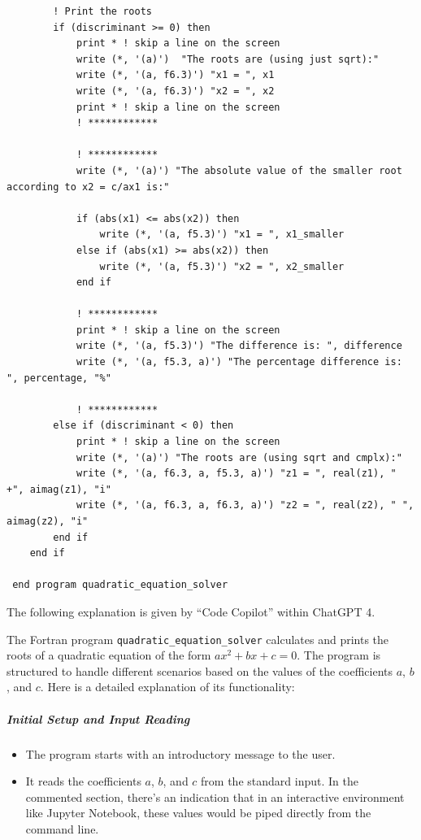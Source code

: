 \begin{verbatim}
        ! Print the roots
        if (discriminant >= 0) then
            print * ! skip a line on the screen
            write (*, '(a)')  "The roots are (using just sqrt):"
            write (*, '(a, f6.3)') "x1 = ", x1
            write (*, '(a, f6.3)') "x2 = ", x2
            print * ! skip a line on the screen
            ! ************

            ! ************
            write (*, '(a)') "The absolute value of the smaller root according to x2 = c/ax1 is:"

            if (abs(x1) <= abs(x2)) then
                write (*, '(a, f5.3)') "x1 = ", x1_smaller
            else if (abs(x1) >= abs(x2)) then
                write (*, '(a, f5.3)') "x2 = ", x2_smaller
            end if

            ! ************
            print * ! skip a line on the screen
            write (*, '(a, f5.3)') "The difference is: ", difference
            write (*, '(a, f5.3, a)') "The percentage difference is: ", percentage, "%"

            ! ************
        else if (discriminant < 0) then
            print * ! skip a line on the screen
            write (*, '(a)') "The roots are (using sqrt and cmplx):"
            write (*, '(a, f6.3, a, f5.3, a)') "z1 = ", real(z1), " +", aimag(z1), "i"
            write (*, '(a, f6.3, a, f6.3, a)') "z2 = ", real(z2), " ",  aimag(z2), "i"
        end if
    end if

 end program quadratic_equation_solver
\end{verbatim}

The following explanation is given by ``Code Copilot'' within ChatGPT 4.

The Fortran program \texttt{quadratic\_equation\_solver} calculates and prints the roots of a quadratic equation of the form $ax^2 + bx + c = 0$. The program is structured to handle different scenarios based on the values of the coefficients $a$, $b$, and $c$. Here is a detailed explanation of its functionality:

\subparagraph{Initial Setup and Input Reading}

\begin{itemize}
\item The program starts with an introductory message to the user.
\item It reads the coefficients $a$, $b$, and $c$ from the standard input. In the commented section, there's an indication that in an interactive environment like Jupyter Notebook, these values would be piped directly from the command line.
\end{itemize}

